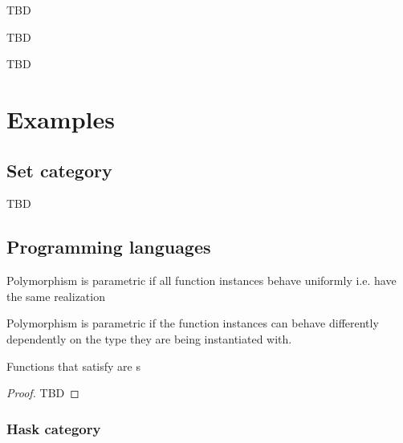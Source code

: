 TBD

\begin{definition}
\label{def:nt}
TBD
\end{definition}

TBD

\section{Examples}

\subsection{\textbf{Set} category}
TBD

\subsection{Programming languages}

\begin{definition}
\label{def:parametric_polymorphism}
Polymorphism is parametric if all function instances behave uniformly
i.e. have the same realization
\end{definition}

\begin{definition}
\label{def:ad_hoc_polymorphism}
Polymorphism is parametric if the function instances can behave
differently dependently on the type they are being instantiated with. 
\end{definition}


\begin{theorem}[Reynolds]
\label{thm:reynolds}
Functions that satisfy  are
s 
\begin{proof}
TBD
\end{proof}
\end{theorem}

\subsubsection{\textbf{Hask} category}

